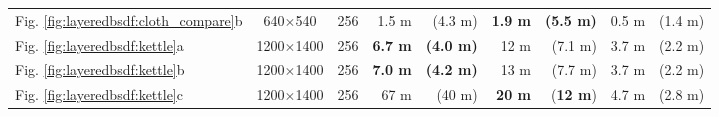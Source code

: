 \begin{table}[!ht]
\begin{tabular}{l|c|c|rr|rr|rr}
	Fig. \ref{fig:layeredbsdf:cloth_compare}b 	& 640$\times$540   & 256  & 1.5 m   		& (4.3 m) 			& \textbf{1.9 m}& \textbf{(5.5 m)}  & 0.5 m & (1.4 m)\\
	Fig. \ref{fig:layeredbsdf:kettle}a 			& 1200$\times$1400 & 256  & \textbf{6.7 m}  & \textbf{(4.0 m)} 	& 12 m  		& (7.1 m)   		& 3.7 m & (2.2 m)\\
	Fig. \ref{fig:layeredbsdf:kettle}b 			& 1200$\times$1400 & 256  & \textbf{7.0 m}  & \textbf{(4.2 m)} 	& 13 m  		& (7.7 m)   		& 3.7 m & (2.2 m)\\
	Fig. \ref{fig:layeredbsdf:kettle}c 			& 1200$\times$1400 & 256  & 67 m 			& (40 m) 			& \textbf{20 m} & (\textbf{12 m})  	& 4.7 m & (2.8 m)\\
	\end{tabular}
\end{table}

